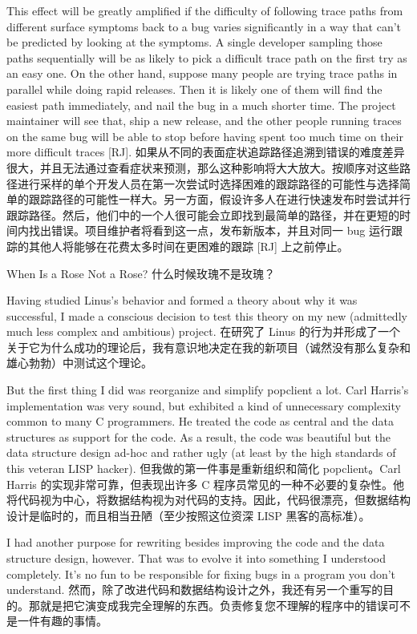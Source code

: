 \documentclass[a4paper,12pt,UTF8,twoside]{ctexbook}
\begin{document}
This effect will be greatly amplified if the difficulty of following trace paths from different surface symptoms back to a bug varies significantly in a way that can't be predicted by looking at the symptoms. A single developer sampling those paths sequentially will be as likely to pick a difficult trace path on the first try as an easy one. On the other hand, suppose many people are trying trace paths in parallel while doing rapid releases. Then it is likely one of them will find the easiest path immediately, and nail the bug in a much shorter time. The project maintainer will see that, ship a new release, and the other people running traces on the same bug will be able to stop before having spent too much time on their more difficult traces [RJ].
如果从不同的表面症状追踪路径追溯到错误的难度差异很大，并且无法通过查看症状来预测，那么这种影响将大大放大。按顺序对这些路径进行采样的单个开发人员在第一次尝试时选择困难的跟踪路径的可能性与选择简单的跟踪路径的可能性一样大。另一方面，假设许多人在进行快速发布时尝试并行跟踪路径。然后，他们中的一个人很可能会立即找到最简单的路径，并在更短的时间内找出错误。项目维护者将看到这一点，发布新版本，并且对同一 bug 运行跟踪的其他人将能够在花费太多时间在更困难的跟踪 [RJ] 上之前停止。

When Is a Rose Not a Rose?
什么时候玫瑰不是玫瑰？

Having studied Linus's behavior and formed a theory about why it was successful, I made a conscious decision to test this theory on my new (admittedly much less complex and ambitious) project.
在研究了 Linus 的行为并形成了一个关于它为什么成功的理论后，我有意识地决定在我的新项目（诚然没有那么复杂和雄心勃勃）中测试这个理论。

But the first thing I did was reorganize and simplify popclient a lot. Carl Harris's implementation was very sound, but exhibited a kind of unnecessary complexity common to many C programmers. He treated the code as central and the data structures as support for the code. As a result, the code was beautiful but the data structure design ad-hoc and rather ugly (at least by the high standards of this veteran LISP hacker).
但我做的第一件事是重新组织和简化 popclient。Carl Harris 的实现非常可靠，但表现出许多 C 程序员常见的一种不必要的复杂性。他将代码视为中心，将数据结构视为对代码的支持。因此，代码很漂亮，但数据结构设计是临时的，而且相当丑陋（至少按照这位资深 LISP 黑客的高标准）。

I had another purpose for rewriting besides improving the code and the data structure design, however. That was to evolve it into something I understood completely. It's no fun to be responsible for fixing bugs in a program you don't understand.
然而，除了改进代码和数据结构设计之外，我还有另一个重写的目的。那就是把它演变成我完全理解的东西。负责修复您不理解的程序中的错误可不是一件有趣的事情。
\end{document}
